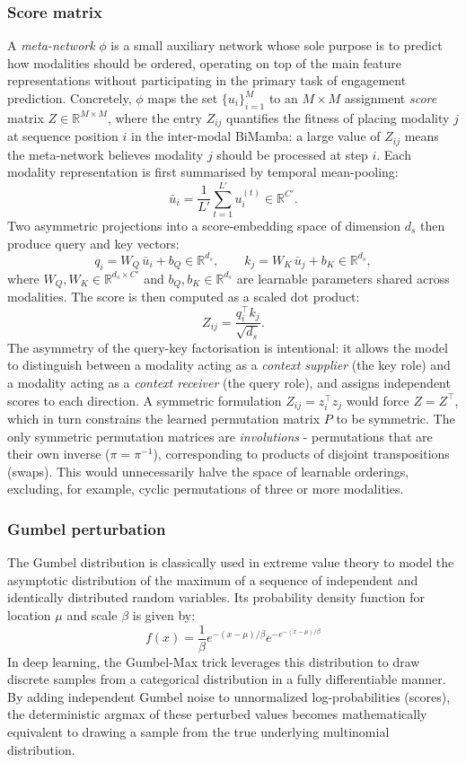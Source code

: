 \documentclass[11pt,a4paper]{article}
\newcommand{\R}{\mathbb{R}}
\begin{document}
	\subsubsection*{Score matrix}
	A \emph{meta-network} $\phi$ is a small auxiliary network whose sole purpose is to predict how modalities should be ordered, operating on top of the main feature representations without participating in the primary task of engagement prediction. Concretely, $\phi$ maps the set $\{u_i\}_{i=1}^M$ to an $M \times M$ assignment \emph{score} matrix $Z \in \R^{M \times M}$, where the entry $Z_{ij}$ quantifies the fitness of placing modality $j$ at sequence position $i$ in the inter-modal BiMamba: a large value of $Z_{ij}$ means the meta-network believes modality $j$ should be processed at step $i$. Each modality representation is first summarised by temporal mean-pooling:
	$$\bar{u}_i = \frac{1}{L'}\sum_{t=1}^{L'} u_i^{(t)} \in \R^{C'}.$$
	Two asymmetric projections into a score-embedding space of dimension $d_s$ then produce query and key vectors:
	$$q_i = W_Q\,\bar{u}_i + b_Q \in \R^{d_s}, \qquad k_j = W_K\,\bar{u}_j + b_K \in \R^{d_s},$$
	where $W_Q, W_K \in \R^{d_s \times C'}$ and $b_Q, b_K \in \R^{d_s}$ are learnable parameters shared across modalities. The score is then computed as a scaled dot product:
	$$Z_{ij} = \frac{q_i^\top k_j}{\sqrt{d_s}}.$$
	The asymmetry of the query-key factorisation is intentional: it allows the model to distinguish between a modality acting as a \emph{context supplier} (the key role) and a modality acting as a \emph{context receiver} (the query role), and assigns independent scores to each direction. A symmetric formulation $Z_{ij} = z_i^\top z_j$ would force $Z = Z^\top$, which in turn constrains the learned permutation matrix $P$ to be symmetric. The only symmetric permutation matrices are \emph{involutions} - permutations that are their own inverse ($\pi = \pi^{-1}$), corresponding to products of disjoint transpositions (swaps). This would unnecessarily halve the space of learnable orderings, excluding, for example, cyclic permutations of three or more modalities.
	
	\subsubsection*{Gumbel perturbation}
	The Gumbel distribution is classically used in extreme value theory to model the asymptotic distribution of the maximum of a sequence of independent and identically distributed random variables. Its probability density function for location $\mu$ and scale $\beta$ is given by: 
	$$f(x) = \frac{1}{\beta} e^{-(x-\mu)/\beta} e^{-e^{-(x-\mu)/\beta}}$$ 
	In deep learning, the Gumbel-Max trick \cite{jang2017} leverages this distribution to draw discrete samples from a categorical distribution in a fully differentiable manner. By adding independent Gumbel noise to unnormalized log-probabilities (scores), the deterministic argmax of these perturbed values becomes mathematically equivalent to drawing a sample from the true underlying multinomial distribution. 
	
\end{document}
